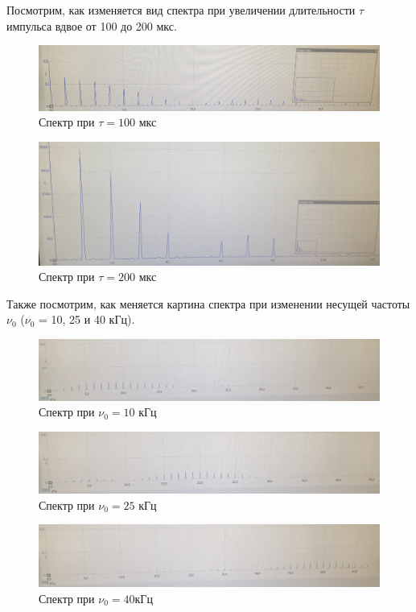 \documentclass[12pt,a4paper]{article}
\begin{document}
Посмотрим, как изменяется вид спектра при увеличении длительности $\tau$ импульса вдвое от 100 до 200 мкс.

\begin{figure}[H]
	\centering
	\includegraphics[width = 7 cm]{src/16a.png}
	\caption{Спектр при $\tau = 100 \text{ мкс}$}
	\label{fig:16a}
\end{figure}

\begin{figure}[H]
	\centering
	\includegraphics[width = 7 cm]{src/16b.png}
	\caption{Спектр при $\tau = 200 \text{ мкс}$}
	\label{fig:16b}
\end{figure}

Также посмотрим, как меняется картина спектра при изменении несущей частоты $\nu_0$ ($\nu_0$ = 10, 25 и 40 кГц).

\begin{figure}[H]
	\centering
	\includegraphics[width = 7 cm]{src/17_10.png}
	\caption{Спектр при $\nu_0 = 10 \text{ кГц}$}
	\label{fig:17_10}
\end{figure}

\begin{figure}[H]
	\centering
	\includegraphics[width = 7 cm]{src/17_25.png}
	\caption{Спектр при $\nu_0 = 25 \text{ кГц}$}
	\label{fig:17_25}
\end{figure}

\begin{figure}[H]
	\centering
	\includegraphics[width = 7 cm]{src/17_40.png}
	\caption{Спектр при $\nu_0 = 40 \text{кГц}$}
	\label{fig:17_40}
\end{figure}
\end{document}

